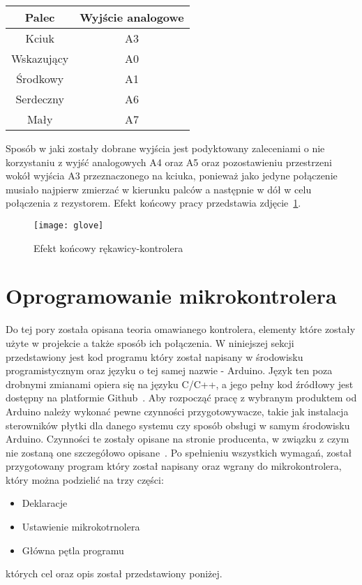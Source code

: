 \begin{center}
\begin{tabular}{|c|c|}
\hline
Palec & Wyjście analogowe \\ \hline
Kciuk & A3 \\ \hline
Wskazujący & A0 \\ \hline
Środkowy & A1 \\ \hline
Serdeczny & A6 \\ \hline
Mały & A7 \\ \hline
\hline
\end{tabular}
\end{center}

Sposób w jaki zostały dobrane wyjścia jest podyktowany zaleceniami o nie korzystaniu z wyjść analogowych A4 oraz A5 oraz pozostawieniu przestrzeni wokół wyjścia A3 przeznaczonego na kciuka, ponieważ jako jedyne połączenie musiało najpierw zmierzać w kierunku palców a następnie w dół w celu połączenia z rezystorem. Efekt końcowy pracy przedstawia zdjęcie~\ref{fig:glove}.

\begin{figure}[h]
\centering
\texttt{[image: glove]}
\caption{Efekt końcowy rękawicy-kontrolera}
\label{fig:glove}
\end{figure}

\section{Oprogramowanie mikrokontrolera}
\label{sec:oprogramowanie}


Do tej pory została opisana teoria omawianego kontrolera, elementy które zostały użyte w projekcie a także sposób ich połączenia. W niniejszej sekcji przedstawiony jest kod programu który został napisany w środowisku programistycznym oraz języku o tej samej nazwie - Arduino. Język ten poza drobnymi zmianami opiera się na języku C/C++, a jego pełny kod źródłowy jest dostępny na platformie Github~\cite{jArduino}. Aby rozpocząć pracę z wybranym produktem od Arduino należy wykonać pewne czynności przygotowywacze, takie jak instalacja sterowników płytki dla danego systemu czy sposób obsługi w samym środowisku Arduino. Czynności te zostały opisane na stronie producenta, w związku z czym nie zostaną one szczegółowo opisane~\cite{guideArduino}. Po spełnieniu wszystkich wymagań, został przygotowany program który został napisany oraz wgrany do mikrokontrolera, który można podzielić na trzy części:
\begin{itemize}
\item Deklaracje
\item Ustawienie mikrokotrnolera
\item Główna pętla programu
\end{itemize}
których cel oraz opis został przedstawiony poniżej.

